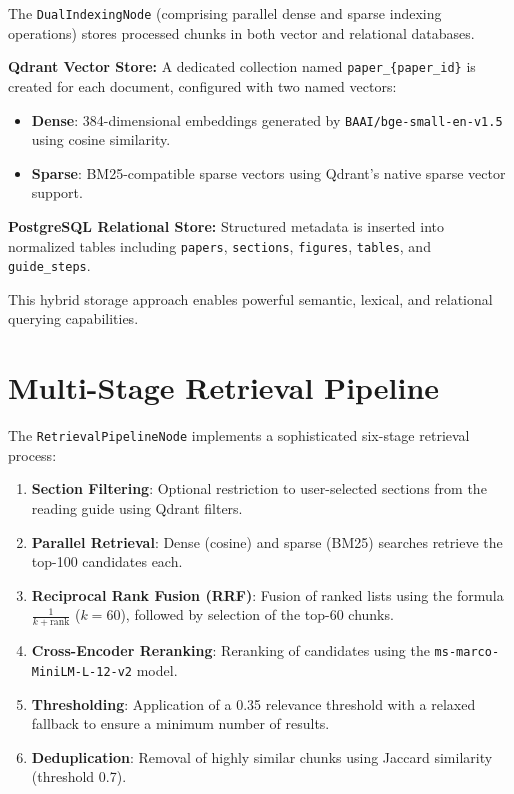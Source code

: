 \documentclass[12pt,a4paper]{report}
\begin{document}
The \texttt{DualIndexingNode} (comprising parallel dense and sparse indexing operations) stores processed chunks in both vector and relational databases.

\textbf{Qdrant Vector Store:} A dedicated collection named \texttt{paper\_\{paper\_id\}} is created for each document, configured with two named vectors:
\begin{itemize}
    \item \textbf{Dense}: 384-dimensional embeddings generated by \texttt{BAAI/bge-small-en-v1.5} using cosine similarity.
    \item \textbf{Sparse}: BM25-compatible sparse vectors using Qdrant’s native sparse vector support.
\end{itemize}

\textbf{PostgreSQL Relational Store:} Structured metadata is inserted into normalized tables including \texttt{papers}, \texttt{sections}, \texttt{figures}, \texttt{tables}, and \texttt{guide\_steps}.

This hybrid storage approach enables powerful semantic, lexical, and relational querying capabilities.

\section{Multi-Stage Retrieval Pipeline}

The \texttt{RetrievalPipelineNode} implements a sophisticated six-stage retrieval process:

\begin{enumerate}
    \item \textbf{Section Filtering}: Optional restriction to user-selected sections from the reading guide using Qdrant filters.
    \item \textbf{Parallel Retrieval}: Dense (cosine) and sparse (BM25) searches retrieve the top-100 candidates each.
    \item \textbf{Reciprocal Rank Fusion (RRF)}: Fusion of ranked lists using the formula $\frac{1}{k + \text{rank}}$ ($k=60$), followed by selection of the top-60 chunks.
    \item \textbf{Cross-Encoder Reranking}: Reranking of candidates using the \texttt{ms-marco-MiniLM-L-12-v2} model.
    \item \textbf{Thresholding}: Application of a 0.35 relevance threshold with a relaxed fallback to ensure a minimum number of results.
    \item \textbf{Deduplication}: Removal of highly similar chunks using Jaccard similarity (threshold 0.7).
\end{enumerate}
\end{document}
